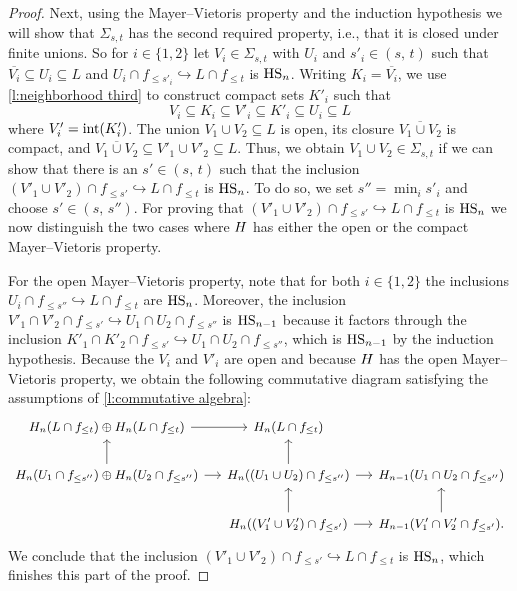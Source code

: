 \begin{proof}
	Next, using the Mayer--Vietoris property and the induction hypothesis we will show that $\Sigma_{s,t}$ has the second required property, i.e., that it is closed under finite unions.
	So for $i \in \{1, 2\}$ let $V_i \in \Sigma_{s,t}$ with $U_i$ and $s'_i \in (s,\, t)$ such that
	$\overline{V_i} \subseteq U_i \subseteq L$
	and
	$U_{i} \cap f_{\leq s'_i} \hookrightarrow L \cap f_{\leq t}$
	is $\mathrm{HS}_n$.
	Writing $K_i = \overline{V_i}$, we use \cref{l:neighborhood third} to construct compact sets $K'_i$ such that
	\begin{equation*}
	V_i \subseteq K_i \subseteq V'_i \subseteq K'_i \subseteq U_i \subseteq L
	\end{equation*}
	where $V'_i = \operatorname{int}(K'_i)$.
	The union $V_1 \cup V_2 \subseteq L$ is open, its closure $\overline{V_1 \cup V_2}$ is compact, and $\overline{V_1 \cup V_2} \subseteq V'_1 \cup V'_2 \subseteq L$.
	Thus, we obtain $V_1 \cup V_2 \in \Sigma_{s,t}$ if we can show that there is an $s' \in (s,\, t)$ such that the inclusion
	$\left(V'_1 \cup V'_2 \right) \cap f_{\leq s'} \hookrightarrow L \cap f_{\leq t}$
	is $\mathrm{HS}_n$.
	To do so, we set $s'' = \min_i s'_i$ and choose $s' \in (s,\, s'')$.
	For proving that $\left(V'_1 \cup V'_2 \right) \cap f_{\leq s'} \hookrightarrow L \cap f_{\leq t}$ is $\mathrm{HS}_n$ we now distinguish the two cases where $H$ has either the open or the compact Mayer--Vietoris property.

	For the open Mayer--Vietoris property, note that for both $i \in \{1, 2\}$ the inclusions
	$U_i \cap f_{\leq s''} \hookrightarrow L \cap f_{\leq t}$
	are $\mathrm{HS}_n$.
	Moreover, the inclusion
	$V'_1 \cap V'_2 \cap f_{\leq s'} \hookrightarrow U_1 \cap U_2 \cap f_{\leq s''}$
	is $\mathrm{HS}_{n-1}$ because it factors through the inclusion
	$K'_1 \cap K'_2 \cap f_{\leq s'} \hookrightarrow U_1 \cap U_2 \cap f_{\leq s''}$,
	which is $\mathrm{HS}_{n-1}$ by the induction hypothesis.
	Because the $V_i$ and $V'_i$ are open and because $H$ has the open Mayer--Vietoris property, we obtain the following commutative diagram satisfying the assumptions of \cref{l:commutative algebra}:
	\[
	\begin{tikzcd}[column sep=small,every matrix/.append style={nodes={font=\small}}]
	\H_n(L \cap f_{\leq t}) \oplus \H_n(L \cap f_{\leq t}) \arrow[r] &
	\H_n(L \cap f_{\leq t}) & \\
	\H_{n}(U_1 \cap f_{\leq s''}) \oplus \H_n(U_2 \cap f_{\leq s''}) \arrow[r] \arrow[u] &
	\H_{n}((U_1 \cup U_2) \cap f_{\leq s''}) \arrow[r] \arrow[u] &
	\H_{n-1}(U_1 \cap U_2 \cap f_{\leq s''}) \\ &
	\H_{n}((V'_1 \cup V'_2) \cap f_{\leq s'}) \arrow[r] \arrow[u] &
	\H_{n-1}(V'_1 \cap V'_2 \cap f_{\leq s'}) \arrow[u].
	\end{tikzcd}
	\]
	We conclude that the inclusion
	$\left(V'_1 \cup V'_2 \right) \cap f_{\leq s'} \hookrightarrow L \cap f_{\leq t}$
	is $\mathrm{HS}_n$, which finishes this part of the proof.


\end{proof}
